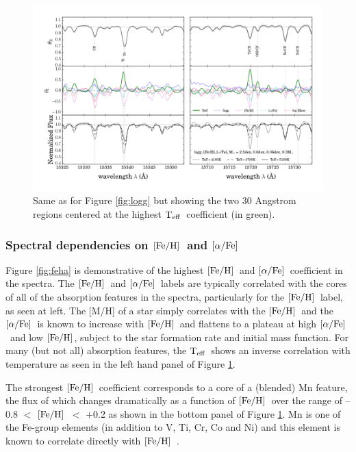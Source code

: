 \documentclass[12pt, preprint]{aastex}
\newcommand{\teff}{\mbox{$\rm T_{eff}$}}
\newcommand{\feh}{\mbox{$\rm [Fe/H]$}}
\newcommand{\alphafe}{\mbox{$\rm [\alpha/Fe]$}}
\begin{document}
\begin{figure}[h!]
\centering
    \includegraphics[scale=0.51]{./plots/coeffs_t_3.png}
  \caption{Same as for Figure \ref{fig:logg} but showing the two 30 Angstrom regions centered at the highest \teff\ coefficient (in green).}
\label{fig:teff}
\end{figure}



\subsubsection{Spectral dependencies on \feh\ and \alphafe} 

Figure \ref{fig:feha} is demonstrative of the highest \feh\ and \alphafe\ coefficient in the spectra. The \feh\ and \alphafe\ labels are typically correlated with the cores of all of the absorption features in the spectra, particularly for the \feh\ label, as seen at left. The [M/H] of  a star simply correlates with the \feh\ and the \alphafe\ is known to increase with \feh\ and flattens to a plateau at high \alphafe\ and low \feh, subject to the star formation rate and initial mass function. For many (but not all) absorption features, the \teff\ shows an inverse correlation with temperature as seen in the left hand panel of Figure \ref{fig:teff}. 

The strongest \feh\ coefficient corresponds to a core of a (blended) Mn feature, the flux of which changes dramatically as a function of \feh\ over the range of  --0.8 $<$ \feh\ $<$ +0.2 as shown in the bottom panel of Figure \ref{fig:teff}. Mn is one of the Fe-group elements (in addition to V, Ti, Cr, Co and Ni) and this element is known to correlate directly with \feh\ \citep[see][]{Maria2008, B2015}. 
\end{document}
